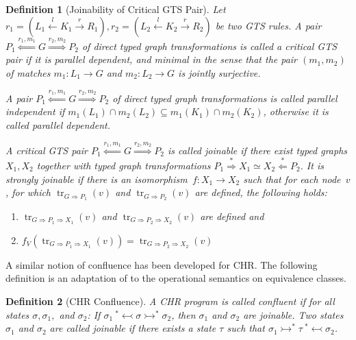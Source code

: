 \documentclass{tlp}
\newtheorem{definition}{Definition}[section]
\newcommand{\der}{\ensuremath{\rightarrowtail}}
\newcommand{\derrev}{\ensuremath{\ {}^*\!\!\leftarrowtail}}
\newcommand{\dergts}{\ensuremath{\Rightarrow}}
\DeclareMathOperator{\track}{tr}
\begin{document}
\begin{definition}[Joinability of Critical GTS Pair]\label{def:gts_cp} Let $r_1 =
(L_1 \stackrel{l}{\leftarrow} K_1 \stackrel{r}{\rightarrow} R_1), r_2 = (L_2
\stackrel{l}{\leftarrow} K_2 \stackrel{r}{\rightarrow} R_2)$ be two GTS rules. A
pair $P_1 \stackrel{r_1, m_1}{\Longleftarrow} G \stackrel{r_2,
m_2}{\Longrightarrow} P_2$ of direct typed graph transformations is called a
\emph{critical GTS pair} if it is parallel dependent, and minimal in the sense
that the pair $(m_1, m_2)$ of matches $m_1: L_1 \rightarrow G$ and $m_2 : L_2
\rightarrow G$ is jointly surjective.

A pair $P_1 \stackrel{r_1, m_1}{\Longleftarrow} G \stackrel{r_2,
m_2}{\Longrightarrow} P_2$ of direct typed graph transformations is called
\emph{parallel independent} if $m_1(L_1) \cap m_2(L_2) \subseteq m_1(K_1) \cap
m_2(K_2)$, otherwise it is called \emph{parallel dependent}.

A critical GTS pair $P_1 \stackrel{r_1, m_1}{\Longleftarrow} G \stackrel{r_2,
m_2}{\Longrightarrow} P_2$ is called \emph{joinable} if there exist typed graphs
$X_1,X_2$ together with typed graph transformations $P_1
\stackrel{*}{\Longrightarrow} X_1 \simeq X_2 \stackrel{*}{\Longleftarrow} P_2$.
It is \emph{strongly joinable} if there is an isomorphism~$f: X_1 \rightarrow
X_2$ such that for each node~$v$, for which $\track_{G \dergts P_1}(v)$ and
$\track_{G \dergts P_2}(v)$ are defined, the following holds:
\begin{enumerate}
  \item $\track_{G \dergts P_1 \dergts X_1}(v)$ and $\track_{G
  \dergts P_2 \dergts X_2}(v)$ are defined and
  \item $f_V(\track_{G \dergts P_1 \dergts X_1}(v)) = \track_{G
  \dergts P_2 \dergts X_2}(v)$
\end{enumerate}
\end{definition}

A similar notion of confluence has been developed for CHR. The following
definition is an adaptation of \cite{fruehwirth09} to the operational semantics
on equivalence classes.

\begin{definition}[CHR Confluence] A CHR program is called \emph{confluent} if
for all states $\sigma, \sigma_1,$ and $\sigma_2$: If $\sigma_1 \derrev \sigma \der^*
\sigma_2$, then $\sigma_1$ and $\sigma_2$ are joinable. Two states $\sigma_1$ and
$\sigma_2$ are called \emph{joinable} if there exists a state $\tau$ such that
$\sigma_1 \der^* \tau \derrev \sigma_2$.
\end{definition}
\end{document}
